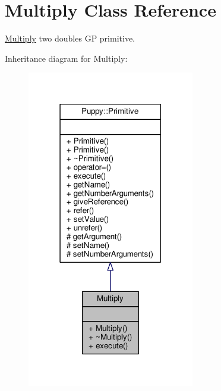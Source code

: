 \hypertarget{classMultiply}{}\section{Multiply Class Reference}
\label{classMultiply}


\hyperlink{classMultiply}{Multiply} two doubles G\+P primitive.  




Inheritance diagram for Multiply\+:
\nopagebreak
\begin{figure}[H]
\begin{center}
\leavevmode
\includegraphics[width=207pt]{classMultiply__inherit__graph}
\end{center}
\end{figure}



